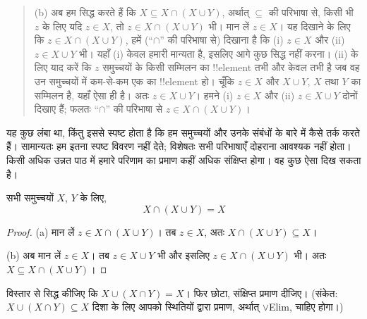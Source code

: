 \documentclass[../../../include/open-logic-section]{subfiles}
\begin{document}
\begin{explain}
\begin{quote}
(b) अब हम सिद्ध करते हैं कि $X \subseteq X \cap (X \cup Y)$, अर्थात्
$\subseteq$ की परिभाषा से, किसी भी~$z$ के लिए यदि $z \in X$, तो $z \in X
\cap (X \cup Y)$ भी। मान लें $z \in X$। यह दिखाने के लिए कि $z \in X
\cap (X \cup Y)$, हमें (``$\cap$'' की परिभाषा से) दिखाना है कि (i) $z \in
X$ और (ii) $z \in X \cup Y$ भी। यहाँ (i) केवल हमारी मान्यता है, इसलिए आगे
कुछ सिद्ध नहीं करना। (ii) के लिए याद करें कि $z$ समुच्चयों के किसी सम्मिलन
का !!{element} तभी और केवल तभी है जब वह उन समुच्चयों में कम-से-कम एक का
!!{element} हो। चूँकि $z \in X$ और $X \cup Y$, $X$ तथा $Y$ का सम्मिलन है,
यहाँ ऐसा ही है। अतः $z \in X \cup Y$। हमने (i) $z \in X$ और (ii) $z \in
X \cup Y$ दोनों दिखाए हैं; फलतः ``$\cap$'' की परिभाषा से $z \in X \cap (X
\cup Y)$।
\end{quote}

यह कुछ लंबा था, किंतु इससे स्पष्ट होता है कि हम समुच्चयों और उनके संबंधों के
बारे में कैसे तर्क करते हैं। सामान्यतः हम इतना स्पष्ट विवरण नहीं देते;
विशेषतः सभी परिभाषाएँ दोहराना आवश्यक नहीं होता। किसी अधिक उन्नत पाठ में हमारे
परिणाम का प्रमाण कहीं अधिक संक्षिप्त होगा। वह कुछ ऐसा दिख सकता है।
\end{explain}


\begin{prop}[अवशोषण]
सभी समुच्चयों $X$, $Y$ के लिए,
\[
X \cap (X \cup Y) = X
\]
\end{prop}

\begin{proof}
(a) मान लें $z \in X \cap (X \cup Y)$। तब $z \in X$, अतः $X \cap (X
  \cup Y) \subseteq X$।

(b) अब मान लें $z \in X$। तब $z \in X \cup Y$ भी और इसलिए $z \in X
\cap (X \cup Y)$ भी। अतः $X \subseteq X \cap (X \cup Y)$।
\end{proof}

\begin{prob}
विस्तार से सिद्ध कीजिए कि $X \cup (X \cap Y) = X$। फिर छोटा, संक्षिप्त
प्रमाण दीजिए। (संकेत: $X \cup (X \cap Y) \subseteq X$ दिशा के लिए आपको
स्थितियों द्वारा प्रमाण, अर्थात् $\lor$Elim, चाहिए होगा।)
\end{prob}
\end{document}
